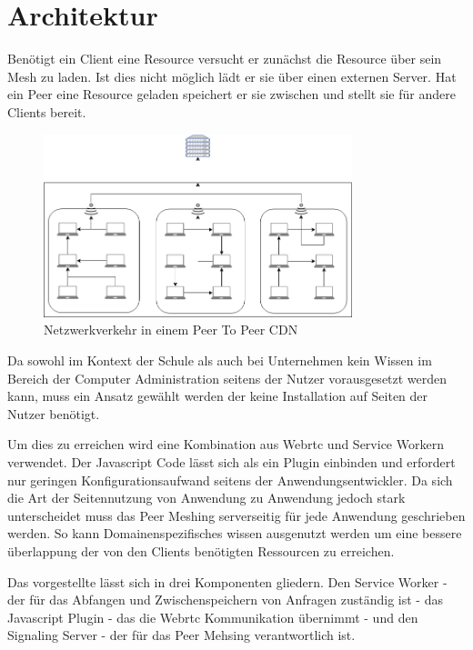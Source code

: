 \section{Architektur}

Benötigt ein Client eine Resource versucht er zunächst die Resource über sein \pTp Mesh zu laden. Ist dies nicht möglich lädt er sie über einen externen Server. Hat ein Peer eine Resource geladen speichert er sie zwischen und stellt sie für andere Clients bereit.

\begin{figure}[!h]
	\centering
	\includegraphics[width=0.8\textwidth]{figures/network_p2p}
	\caption[A Figure Short-Title]{Netzwerkverkehr in einem Peer To Peer CDN}
	\label{fig:mesh}
\end{figure}

Da sowohl im Kontext der Schule als auch bei Unternehmen kein Wissen im Bereich der Computer Administration seitens der Nutzer vorausgesetzt werden kann, muss ein Ansatz gewählt werden der keine Installation auf Seiten der Nutzer benötigt.

Um dies zu erreichen wird eine Kombination aus Webrtc und Service Workern verwendet. Der Javascript Code lässt sich als ein Plugin einbinden und erfordert nur geringen Konfigurationsaufwand seitens der Anwendungsentwickler. Da sich die Art der Seitennutzung von Anwendung zu Anwendung jedoch stark unterscheidet muss das Peer Meshing serverseitig für jede Anwendung geschrieben werden. So kann Domainenspezifisches wissen ausgenutzt werden um eine bessere überlappung der von den Clients benötigten Ressourcen zu erreichen. 

Das vorgestellte \pTp \cdn lässt sich in drei Komponenten gliedern. Den Service Worker - der für das Abfangen und Zwischenspeichern von Anfragen zuständig ist - das Javascript Plugin - das die Webrtc Kommunikation übernimmt - und den Signaling Server - der für das Peer Mehsing verantwortlich ist. 

